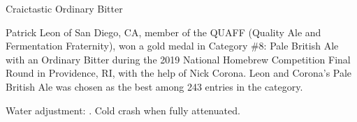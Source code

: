 \stylesection{\styleordinarybitter}

\begin{recipie}{Craictastic Ordinary Bitter}

\begin{aboutblock}
Patrick Leon of San Diego, CA, member of the QUAFF (Quality Ale and Fermentation
Fraternity), won a gold medal in Category \#8: Pale British Ale with an Ordinary
Bitter during the 2019 National Homebrew Competition Final Round in Providence,
RI, with the help of Nick Corona. Leon and Corona's Pale British Ale was chosen as
the best among 243 entries in the category. \sourceaha
\end{aboutblock}


\begin{methodandtiming}
 
\begin{mashsteps}
\end{mashsteps}

\begin{fermentationsteps}
\end{fermentationsteps}

\begin{directions}
Water adjustment: . Cold crash when fully
attenuated.
\end{directions}

\end{methodandtiming}

\pagebreak

\begin{ingredientsblock}

\begin{malts}
\end{malts}

\begin{hops}
\end{hops}


\end{ingredientsblock}

\end{recipie}
